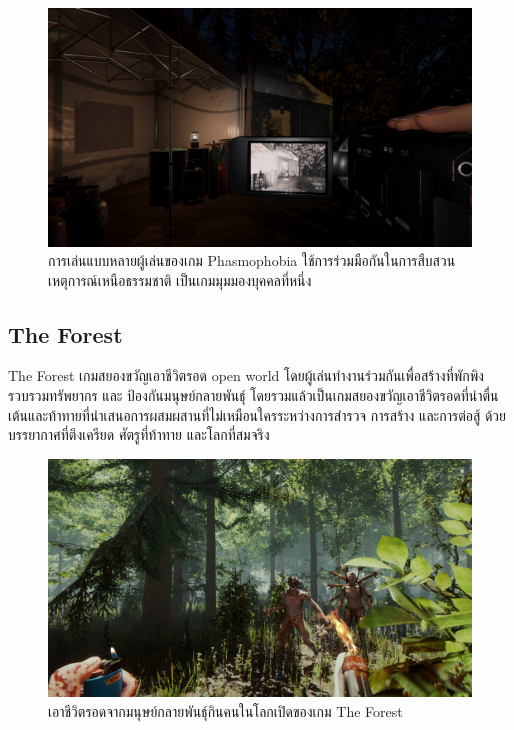 \begin{figure}[h]
  \begin{center}
  \includegraphics[width=\textwidth]{./img/phasmophobia.jpg}
  \end{center}
  \caption[ภาพเกม Phasmophobia]{การเล่นแบบหลายผู้เล่นของเกม Phasmophobia ใช้การร่วมมือกันในการสืบสวนเหตุการณ์เหนือธรรมชาติ เป็นเกมมุมมองบุคคลที่หนึ่ง}
  \label{fig:Phasmophobia}
\end{figure}
\subsection{The Forest}

The Forest เกมสยองขวัญเอาชีวิตรอด open world โดยผู้เล่นทำงานร่วมกันเพื่อสร้างที่พักพิง รวบรวมทรัพยากร และ ป้องกันมนุษย์กลายพันธุ์ โดยรวมแล้วเป็นเกมสยองขวัญเอาชีวิตรอดที่น่าตื่นเต้นและท้าทายที่นำเสนอการผสมผสานที่ไม่เหมือนใครระหว่างการสำรวจ การสร้าง และการต่อสู้ ด้วยบรรยากาศที่ตึงเครียด ศัตรูที่ท้าทาย และโลกที่สมจริง \cite{TheForest}

\begin{figure}[h]
  \begin{center}
  \includegraphics[width=\textwidth]{./img/theforest.jpg}
  \end{center}
  \caption[ภาพเกม The Forest]{เอาชีวิตรอดจากมนุษย์กลายพันธุ์กินคนในโลกเปิดของเกม The Forest}
  \label{fig:TheForest}
\end{figure}

